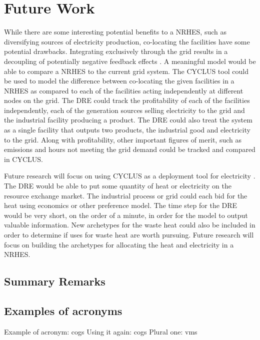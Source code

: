 \documentclass[12pt]{UIdahoMastersThesis}
\begin{document}
\chapter{Future Work}
While there are some interesting potential benefits to a NRHES, such as diversifying sources of electricity production, co-locating the facilities have some potential drawbacks.  Integrating exclusively through the grid results in a decoupling of potentially negative feedback effects \cite{Harrison2016}.  A meaningful model would be able to compare a NRHES to the current grid system. The CYCLUS tool could be used to model the difference between co-locating the given facilities in a NRHES as compared to each of the facilities acting independently at different nodes on the grid.  The DRE could track the profitability of each of the facilities independently, each of the generation sources selling electricity to the grid and the industrial facility producing a product.  The DRE could also treat the system as a single facility that outputs two products, the industrial good and electricity to the grid. Along with profitability, other important figures of merit, such as emissions and hours not meeting the grid demand could be tracked and compared in CYCLUS.

Future research will focus on using CYCLUS as a deployment tool for electricity \cite{redfoot_rabiti_2017}. The DRE would be able to put some quantity of heat or electricity on the resource exchange market.  The industrial process or grid could each bid for the heat using economics or other preference model.  The time step for the DRE would be very short, on the order of a minute, in order for the model to output valuable information.
 New archetypes for the waste heat could also be included in order to determine if uses for waste heat are worth pursuing.  Future research will focus on building the archetypes for allocating the heat and electricity in a NRHES.
\section{Summary Remarks}


\section{Examples of acronyms}
Example of acronym: \ac{cogs}
Using it again: \ac{cogs}
Plural one: \acp{vm}

\end{document}
